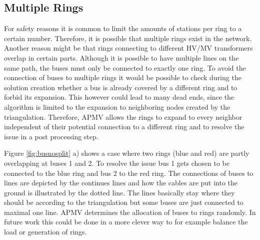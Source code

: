 \subsection{Multiple Rings}
For safety reasons it is common to limit the amounts of stations per ring to a certain number. Therefore, it is possible that multiple rings exist in the network. Another reason might be that rings connecting to different HV/MV transformers overlap in certain parts. Although it is possible to have multiple lines on the same path, the buses must only be connected to exactly one ring. To avoid the connection of buses to multiple rings it would be possible to check during the solution creation whether a bus is already covered by a different ring and to forbid its expansion. This however could lead to many dead ends, since the algorithm is limited to the expansion to neighboring nodes created by the triangulation. Therefore, APMV allows the rings to expand to every neighbor independent of their potential connection to a different ring and to resolve the issue in a post processing step.

Figure \ref{fig:busnosplit} a) shows a case where two rings (blue and red) are partly overlapping at buses 1 and 2. To resolve the issue bus 1 gets chosen to be connected to the blue ring and bus 2 to the red ring. The connections of buses to lines are depicted by the continues lines and how the cables are put into the ground is illustrated by the dotted line. The lines basically stay where they should be according to the triangulation but some buses are just connected to maximal one line. APMV determines the allocation of buses to rings randomly. In future work this could be done in a more clever way to for example balance the load or generation of rings.

